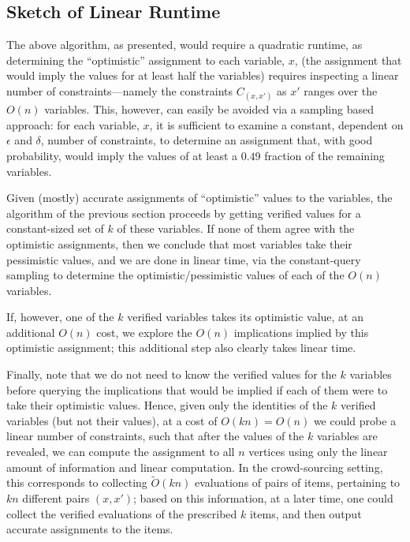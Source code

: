\documentclass[anon,12pt]{colt2018}
\newcommand{\eps}{\epsilon}
\begin{document}
\subsection{Sketch of Linear Runtime}\label{sec:linSketch}

The above algorithm, as presented, would require a quadratic runtime, as determining the ``optimistic'' assignment to each variable, $x$, (the assignment that would imply the values for at least half the variables) requires inspecting a linear number of constraints---namely the constraints $C_{(x,x')}$ as $x'$ ranges over the $O(n)$ variables.  This, however, can easily be avoided via a sampling based approach:  for each variable, $x$, it is sufficient to examine a constant, dependent on $\eps$ and $\delta$, number of constraints, to determine an assignment that, with good probability, would imply the values of at least a $0.49$ fraction of the remaining variables.

Given (mostly) accurate assignments of ``optimistic'' values to the variables, the algorithm of the previous section proceeds by getting verified values for a constant-sized set of $k$ of these variables.  If none of them agree with the optimistic assignments, then we conclude that most variables take their pessimistic values, and we are done in linear time, via the constant-query sampling to determine the optimistic/pessimistic values of each of the $O(n)$ variables.

If, however, one of the $k$ verified variables takes its optimistic value, at an additional $O(n)$ cost, we explore the $O(n)$ implications implied by this optimistic assignment; this additional step also clearly takes linear time.    

Finally, note that we do not need to know the verified values for the $k$ variables before querying the implications that would be implied if each of them were to take their optimistic values.  Hence, given only the identities of the $k$ verified variables (but not their values), at a cost of $O(kn)=O(n)$ we could probe a linear number of constraints, such that after the values of the $k$ variables are revealed, we can compute the assignment to all $n$ vertices using only the linear amount of information and linear computation.   In the crowd-sourcing setting, this corresponds to collecting $\tilde{O}(kn)$ evaluations of pairs of items, pertaining to $kn$ different pairs $(x,x')$; based on this information, at a later time, one could collect the verified evaluations of the prescribed $k$ items, and then output accurate assignments to the items.
\end{document}
